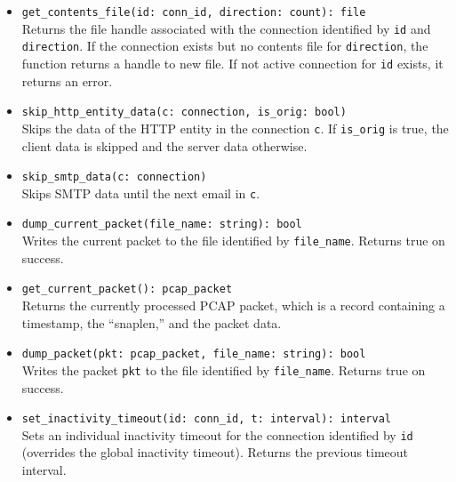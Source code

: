 \documentclass[10pt,landscape]{article}
\newcommand{\verbose}[1]{#1}
\newcommand{\verbose}[1]{}
\newcommand{\ReturnsTrueOnSuccess}{Returns true on success.\xspace}
\begin{document}
\begin{multicols*}{2}
\begin{itemize}
{\begin{itemize}
        Results in the two directions being intermixed in the file, in the
        order the data was seen by Bro.
    \end{itemize}
}
    Returns false if \verb|id| does not point to an active connection and
    true otherwise.
\verbose{
    Note that the data recorded to the file reflects the byte
    stream, not the contents of individual packets. Reordering and duplicates
    are removed. If any data is missing, the recording stops at the missing
    data; this can happen, e.g., due to an \verb|ack_above_hole| event.
}
  \item \verb|get_contents_file(id: conn_id, direction: count): file|\\
    Returns the file handle associated with the connection identified by
    \texttt{id} and \texttt{direction}. If the connection exists but no
    contents file for \texttt{direction}, the function returns a handle to new
    file. If not active connection for \texttt{id} exists, it returns an error.
  \item \verb|skip_http_entity_data(c: connection, is_orig: bool)|\\
    Skips the data of the HTTP entity in the connection \texttt{c}. If
    \verb|is_orig| is true, the client data is skipped and the server data
    otherwise.
  \item \verb|skip_smtp_data(c: connection)|\\
    Skips SMTP data until the next email in \texttt{c}.
  \item \verb|dump_current_packet(file_name: string): bool|\\
    Writes the current packet to the file identified by \verb|file_name|.
    \ReturnsTrueOnSuccess
\verbose{
  \item \verb|get_current_packet(): pcap_packet|\\
    Returns the currently processed PCAP packet, which is a record containing a
    timestamp, the ``snaplen,'' and the packet data.
  \item \verb|dump_packet(pkt: pcap_packet, file_name: string): bool|\\
    Writes the packet \verb|pkt| to the file identified by \verb|file_name|.
    \ReturnsTrueOnSuccess
  \item \verb|set_inactivity_timeout(id: conn_id, t: interval): interval|\\
    Sets an individual inactivity timeout for the connection identified by
    \texttt{id} (overrides the global inactivity timeout).
    Returns the previous timeout interval.
}
\end{itemize}


\end{multicols*}
\end{document}

